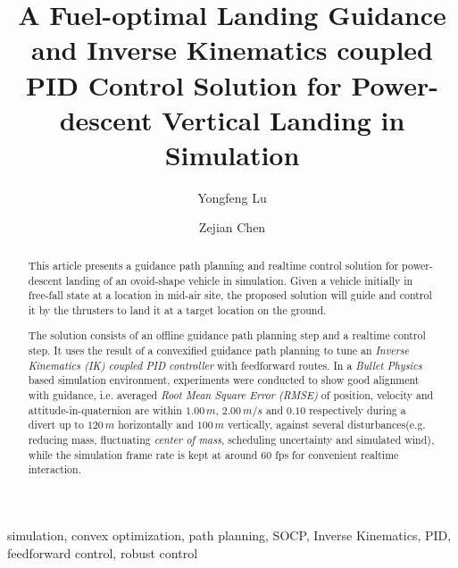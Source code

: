 \documentclass[10pt]{elsarticle}
\begin{document}
\begin{frontmatter} %

\title{A Fuel-optimal Landing Guidance and Inverse Kinematics coupled PID Control Solution for Power-descent Vertical Landing in Simulation}

\author{Yongfeng Lu}
\author{Zejian Chen}
\address{Shenzhen Lokcol Interactive Ltd.}
\address{Block 8, $1^{st}$ Weiye Road, Dongguan City, Guangdong Province, China}
\maketitle

\begin{abstract}
This article presents a guidance path planning and realtime control solution for power-descent landing of an ovoid-shape vehicle in simulation. Given a vehicle initially in free-fall state at a location in mid-air site, the proposed solution will guide and control it by the thrusters to land it at a target location on the ground.         

The solution consists of an offline guidance path planning step and a realtime control step. It uses the result of a convexified guidance path planning to tune an \textit{Inverse Kinematics (IK) coupled PID controller} with feedforward routes. In a \textit{Bullet Physics}\cite{bulletphy} based simulation environment, experiments were conducted to show good alignment with guidance, i.e. averaged \textit{Root Mean Square Error (RMSE)} of position, velocity and attitude-in-quaternion are within $1.00 \, m$, $2.00 \, m/s$ and $0.10$ respectively during a divert up to $120 \, m$ horizontally and $100 \, m$ vertically, against several disturbances(e.g. reducing mass, fluctuating \textit{center of mass}, scheduling uncertainty and simulated wind), while the simulation frame rate is kept at around 60 fps for convenient realtime interaction. 
\end{abstract}

\begin{keyword}
simulation, convex optimization, path planning, SOCP, Inverse Kinematics, PID, feedforward control, robust control   
\end{keyword}
\end{frontmatter}

\abovedisplayskip=3pt
\abovedisplayshortskip=3pt
\belowdisplayskip=0pt
\belowdisplayshortskip=0pt
\abovecaptionskip=0pt
\belowcaptionskip=0pt
\end{document}

